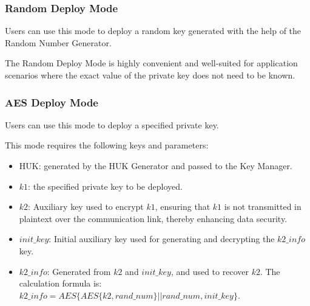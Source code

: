 \documentclass[main\_\_EN.tex]{subfiles}
\begin{document}
\subsubsection{Random Deploy Mode}
Users can use this mode to deploy a random key generated with the help of the Random Number Generator.

\begin{tiplisting}
    The Random Deploy Mode is highly convenient and well-suited for application scenarios where the exact value of the private key does not need to be known.
\end{tiplisting}


\subsubsection{AES Deploy Mode}

Users can use this mode to deploy a specified private key.

This mode requires the following keys and parameters:
\begin{itemize}
    \item HUK: generated by the HUK Generator and passed to the Key Manager.
    \item \begin{math}k1\end{math}: the specified private key to be deployed.
    \item \begin{math}k2\end{math}: Auxiliary key used to encrypt \begin{math}k1\end{math}, ensuring that \begin{math}k1\end{math} is not transmitted in plaintext over the communication link, thereby enhancing data security.
    \item \hyperref[para:initkey]{\begin{math}init\_key\end{math}}: Initial auxiliary key used for generating and decrypting the \begin{math}k2\_info\end{math} key.
    \item \hyperref[para:k2info]{\begin{math}k2\_info\end{math}}: Generated from \hyperref[para:k2]{\begin{math}k2\end{math}} and \hyperref[para:initkey]{\begin{math}init\_key\end{math}}, and used to recover \hyperref[para:k2]{\begin{math}k2\end{math}}. The calculation formula is: \begin{math}k2\_info = AES\{AES\{k2,rand\_num\}||rand\_num,init\_key\}\end{math}.
\end{itemize}
\end{document}
